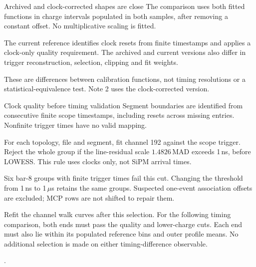\begin{frame}{Archived and clock-corrected shapes are close}
\small
The comparison uses both fitted functions in charge intervals populated in both
samples, after removing a constant offset. No multiplicative scaling is fitted.
\begin{center}

\end{center}
The current reference identifies clock resets from finite timestamps and applies
a clock-only quality requirement. The archived and current versions also differ in trigger
reconstruction, selection, clipping and fit weights.

These are differences between calibration functions, not timing resolutions
or a statistical-equivalence test. Note 2 uses the clock-corrected version.
\end{frame}

\begin{frame}{Clock quality before timing validation}
\small
Segment boundaries are identified from consecutive finite scope timestamps,
including resets across missing entries. Nonfinite trigger times have no valid mapping.

For each topology, file and segment, fit channel 192 against the scope trigger.
Reject the whole group if the line-residual scale $1.4826\,\mathrm{MAD}$ exceeds
1\,ns, before LOWESS. This rule uses clocks only, not SiPM arrival times.

Six bar-8 groups with finite trigger times fail this cut. Changing the threshold
from 1\,ns to 1\,$\mu$s retains the same groups. Suspected one-event association
offsets are excluded; MCP rows are not shifted to repair them.

Refit the channel walk curves after this selection. For the following timing
comparison, both ends must pass the quality and lower-charge cuts. Each end
must also lie within its populated reference bins and outer profile means.
No additional selection is made on either timing-difference observable.

{\scriptsize {}.}
\end{frame}


